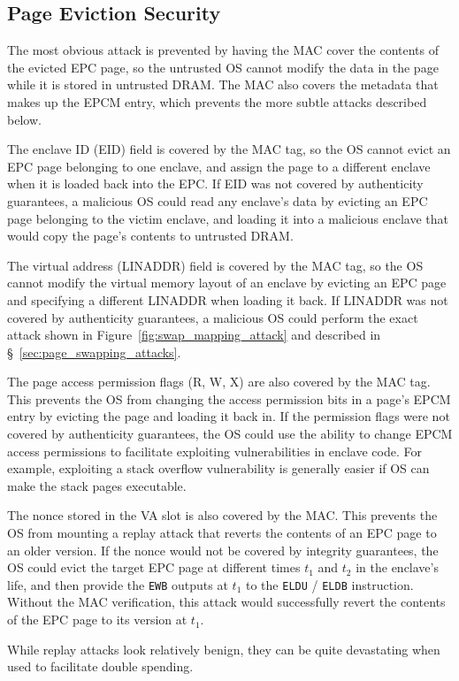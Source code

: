 \subsection {Page Eviction Security}

The most obvious attack is prevented by having the MAC cover the contents of
the evicted EPC page, so the untrusted OS cannot modify the data in the page
while it is stored in untrusted DRAM. The MAC also covers the metadata that
makes up the EPCM entry, which prevents the more subtle attacks described
below.

The enclave ID (EID) field is covered by the MAC tag, so the OS cannot evict an
EPC page belonging to one enclave, and assign the page to a different enclave
when it is loaded back into the EPC. If EID was not covered by authenticity
guarantees, a malicious OS could read any enclave's data by evicting an EPC
page belonging to the victim enclave, and loading it into a malicious enclave
that would copy the page's contents to untrusted DRAM.

The virtual address (LINADDR) field is covered by the MAC tag, so the OS cannot
modify the virtual memory layout of an enclave by evicting an EPC page and
specifying a different LINADDR when loading it back. If LINADDR was not covered
by authenticity guarantees, a malicious OS could perform the exact attack shown
in Figure~\ref{fig:swap_mapping_attack} and described in
\S~\ref{sec:page_swapping_attacks}.

The page access permission flags (R, W, X) are also covered by the MAC tag.
This prevents the OS from changing the access permission bits in a page's EPCM
entry by evicting the page and loading it back in. If the permission flags were
not covered by authenticity guarantees, the OS could use the ability to change
EPCM access permissions to facilitate exploiting vulnerabilities in enclave
code. For example, exploiting a stack overflow vulnerability is generally
easier if OS can make the stack pages executable.

The nonce stored in the VA slot is also covered by the MAC. This prevents the
OS from mounting a replay attack that reverts the contents of an EPC page to an
older version. If the nonce would not be covered by integrity guarantees, the
OS could evict the target EPC page at different times $t_1$ and $t_2$ in the
enclave's life, and then provide the \texttt{EWB} outputs at $t_1$ to the
\texttt{ELDU} / \texttt{ELDB} instruction. Without the MAC verification, this
attack would successfully revert the contents of the EPC page to its version
at $t_1$.

While replay attacks look relatively benign, they can be quite devastating when
used to facilitate double spending.
